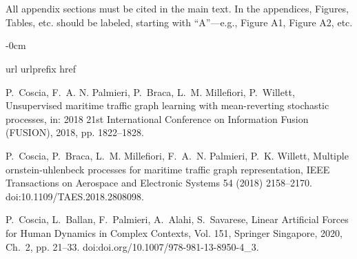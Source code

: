 \documentclass[journal,article,submit,pdftex,moreauthors]{Definitions/mdpi}
\begin{document}
\section[\appendixname~\thesection]{}
All appendix sections must be cited in the main text. In the appendices, Figures, Tables, etc. should be labeled, starting with ``A''---e.g., Figure A1, Figure A2, etc.

\begin{adjustwidth}{-\extralength}{0cm}



%

\begin{thebibliography}{10}
	\expandafter\ifx\csname url\endcsname\relax
	  \def\url#1{\texttt{#1}}\fi
	\expandafter\ifx\csname urlprefix\endcsname\relax\def\urlprefix{URL }\fi
	\expandafter\ifx\csname href\endcsname\relax
	  \def\href#1#2{#2} \def\path#1{#1}\fi
	
	P.~{Coscia}, F.~A. {N. Palmieri}, P.~{Braca}, L.~M. {Millefiori}, P.~{Willett},
	  Unsupervised maritime traffic graph learning with mean-reverting stochastic
	  processes, in: 2018 21st International Conference on Information Fusion
	  (FUSION), 2018, pp. 1822--1828.
	
	P.~Coscia, P.~Braca, L.~M. Millefiori, F.~A.~N. Palmieri, P.~K. Willett,
	  Multiple ornstein-uhlenbeck processes for maritime traffic graph
	  representation, IEEE Transactions on Aerospace and Electronic Systems 54
	  (2018) 2158--2170.
	\newblock \href {https://doi.org/10.1109/TAES.2018.2808098}
	  {\path{doi:10.1109/TAES.2018.2808098}}.
	
	P.~Coscia, L.~Ballan, F.~Palmieri, A.~Alahi, S.~Savarese, Linear Artificial
	  Forces for Human Dynamics in Complex Contexts, Vol. 151, Springer Singapore,
	  2020, Ch.~2, pp. 21--33.
	\newblock \href {https://doi.org/doi.org/10.1007/978-981-13-8950-4\_3}
	  {\path{doi:doi.org/10.1007/978-981-13-8950-4\_3}}.
	

\end{thebibliography}
\end{adjustwidth}
\end{document}
